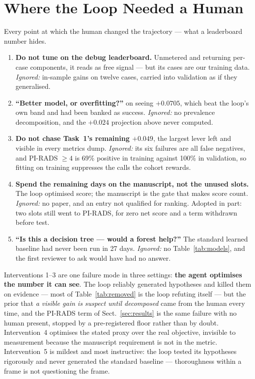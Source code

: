 \documentclass[runningheads]{llncs}
\begin{document}
\section{Where the Loop Needed a Human}
\label{sec:human}

Every point at which the human changed the trajectory --- what a leaderboard number
hides.

\begin{enumerate}
\setlength{\itemsep}{0pt}\setlength{\parsep}{0pt}\setlength{\topsep}{3pt}
\setlength{\partopsep}{0pt}
\item \textbf{Do not tune on the debug leaderboard.} Unmetered and returning per-case
components, it reads as free signal --- but its cases are our training data.
\emph{Ignored:} in-sample gains on twelve cases, carried into validation as if they
generalised.
\item \textbf{``Better model, or overfitting?''} on seeing $+0.0705$, which beat the
loop's own band and had been banked as success. \emph{Ignored:} no prevalence
decomposition, and the $+0.024$ projection above never computed.
\item \textbf{Do not chase Task~1's remaining $+0.049$}, the largest lever left and
visible in every metrics dump. \emph{Ignored:} its six failures are all false
negatives, and PI-RADS ${\geq}4$ is 69\% positive in training against 100\% in
validation, so fitting on training suppresses the calls the cohort rewards.
\item \textbf{Spend the remaining days on the manuscript, not the unused slots.} The
loop optimised score; the manuscript is the gate that makes score count.
\emph{Ignored:} no paper, and an entry not qualified for ranking. Adopted in part:
two slots still went to PI-RADS, for zero net score and a term withdrawn before test.
\item \textbf{``Is this a decision tree --- would a forest help?''} The standard
learned baseline had never been run in 27 days. \emph{Ignored:} no
Table~\ref{tab:models}, and the first reviewer to ask would have had no answer.
\end{enumerate}

Interventions 1--3 are one failure mode in three settings: \textbf{the agent optimises
the number it can see}. The loop reliably generated hypotheses and killed them on
evidence --- most of Table~\ref{tab:removed} is the loop refuting itself --- but the
prior that \emph{a visible gain is suspect until decomposed} came from the human every
time, and the PI-RADS term of Sect.~\ref{sec:results} is the same failure with no human
present, stopped by a pre-registered floor rather than by doubt. Intervention~4
optimises the stated proxy over the real objective, invisible to measurement because
the manuscript requirement is not in the metric. Intervention~5 is mildest and most
instructive: the loop tested its hypotheses rigorously and never generated the standard
baseline --- thoroughness within a frame is not questioning the frame.
\end{document}
